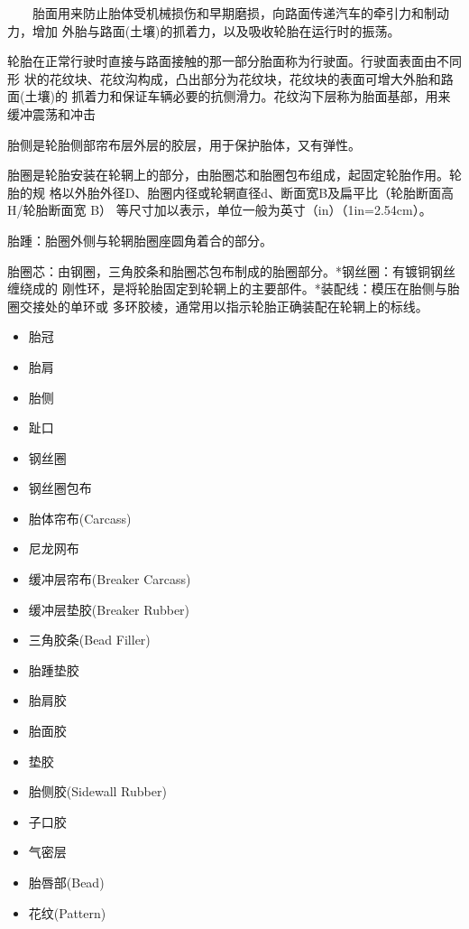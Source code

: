\documentclass{book}
\begin{document}
　　胎面用来防止胎体受机械损伤和早期磨损，向路面传递汽车的牵引力和制动力，增加
外胎与路面(土壤)的抓着力，以及吸收轮胎在运行时的振荡。

轮胎在正常行驶时直接与路面接触的那一部分胎面称为行驶面。行驶面表面由不同形
状的花纹块、花纹沟构成，凸出部分为花纹块，花纹块的表面可增大外胎和路面(土壤)的
抓着力和保证车辆必要的抗侧滑力。花纹沟下层称为胎面基部，用来缓冲震荡和冲击

胎侧是轮胎侧部帘布层外层的胶层，用于保护胎体，又有弹性。

胎圈是轮胎安装在轮辋上的部分，由胎圈芯和胎圈包布组成，起固定轮胎作用。轮胎的规
格以外胎外径D、胎圈内径或轮辋直径d、断面宽B及扁平比（轮胎断面高H/轮胎断面宽 B）
等尺寸加以表示，单位一般为英寸（in）（1in=2.54cm）。

胎踵：胎圈外侧与轮辋胎圈座圆角着合的部分。

胎圈芯：由钢圈，三角胶条和胎圈芯包布制成的胎圈部分。*钢丝圈：有镀铜钢丝缠绕成的
刚性环，是将轮胎固定到轮辋上的主要部件。*装配线：模压在胎侧与胎圈交接处的单环或
多环胶棱，通常用以指示轮胎正确装配在轮辋上的标线。

\begin{itemize}
    \item 胎冠
    \item 胎肩
    \item 胎侧
    \item 趾口
    \item 钢丝圈
    \item 钢丝圈包布
    \item 胎体帘布(Carcass)
    \item 尼龙网布
    \item 缓冲层帘布(Breaker Carcass)
    \item 缓冲层垫胶(Breaker Rubber)
    \item 三角胶条(Bead Filler)
    \item 胎踵垫胶
    \item 胎肩胶
    \item 胎面胶
    \item 垫胶
    \item 胎侧胶(Sidewall Rubber)
    \item 子口胶
    \item 气密层
    \item 胎唇部(Bead)
    \item 花纹(Pattern)
\end{itemize}



\cite{iulian_rosu_finite_2018}


\end{document}
